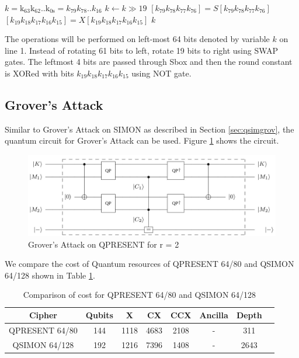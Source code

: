 \documentclass[preprint]{transcrypto}
\begin{document}
\begin{codebox}
\label{proc:keqp}
\li $k = \mathrm{k_{63}}\mathrm{k_{62}}..\mathrm{k_{0s}} = k_{79}k_{78}..k_{16}$
\li $k \gets k \gg 19$
\li $[k_{79}k_{78}k_{77}k_{76}] = S[k_{79}k_{78}k_{77}k_{76}]$
\li $[k_{19}k_{18}k_{17}k_{16}k_{15}] = X[k_{19}k_{18}k_{17}k_{16}k_{15}]$
\li \Return $k$
\end{codebox}

The operations will be performed on left-most 64 bits denoted by variable $k$ on line 1. Instead of rotating 61 bits to left, rotate 19 bits to right using SWAP gates. The leftmost 4 bits are passed through Sbox and then the round constant is XORed with bits $k_{19}k_{18}k_{17}k_{16}k_{15}$ using NOT gate.


\subsection{Grover's Attack}
Similar to Grover's Attack on SIMON as described in Section \ref{sec:qsimgrov}, the quantum circuit for Grover's Attack can be used. Figure \ref{fig:qpgrov} shows the circuit.

\begin{figure}[h!]
    \centering
    \includegraphics[width=\linewidth]{present/qpgrov.jpg}
    \caption{Grover's Attack on QPRESENT for r = 2}
    \label{fig:qpgrov}
\end{figure}

We compare the cost of Quantum resources of QPRESENT 64/80 and QSIMON 64/128 shown in Table \ref{tab:cqpqs}.

\begin{center}
\begin{table}[h!]
    \centering
    \begin{tabular}{ |c|c|c|c|c|c|c|c| } 
     \hline
     Cipher  & Qubits & X & CX & CCX & Ancilla & Depth \\ \hline
     QPRESENT 64/80 & 144 & 1118 & 4683 & 2108 & - & 311 \\ \hline
     QSIMON 64/128 & 192 &1216 & 7396 & 1408 & - & 2643\\ \hline
    \end{tabular}
    \caption{Comparison of cost for QPRESENT 64/80 \cite{gop} and QSIMON 64/128\cite{gos} }
    \label{tab:cqpqs}
\end{table}
\end{center}
\end{document}
